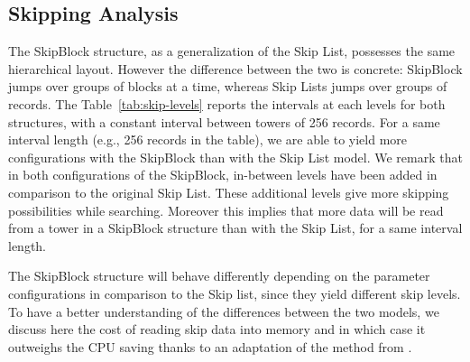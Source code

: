 \subsection{Skipping Analysis}

The SkipBlock structure, as a generalization of the Skip List, possesses the
same hierarchical layout. However the difference between the two is concrete:
SkipBlock jumps over groups of blocks at a time, whereas Skip Lists jumps over
groups of records. The Table~\ref{tab:skip-levels} reports the intervals at
each levels for both structures, with a constant interval between towers of
256 records. For a same interval length (e.g., 256 records in the table), we are
able to yield more configurations with the SkipBlock than with the Skip List
model. We remark that in both configurations of the SkipBlock, in-between
levels have been added in comparison to the original Skip List. These
additional levels give more skipping possibilities while searching. Moreover
this implies that more data will be read from a tower in a SkipBlock structure
than with the Skip List, for a same interval length.

\begin{table}
\centering
{}
\caption{Interval length for each skip levels.}
\label{tab:skip-levels}
\end{table}

The SkipBlock structure will behave differently depending on the parameter
configurations in comparison to the Skip list, since they yield different skip
levels. To have a better understanding of the differences between the two
models, we discuss here the cost of reading skip data into memory and in which
case it outweighs the CPU saving thanks to an adaptation of the method from
\cite{moffat:96}.

